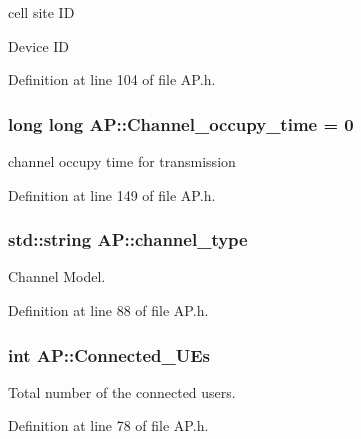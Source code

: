 cell site I\-D 

Device I\-D 

Definition at line 104 of file A\-P.\-h.

\hypertarget{classAP_a2c168786c0400fa590bed7fabbca741e}{
\subsubsection[{Channel\-\_\-occupy\-\_\-time}]{\setlength{\rightskip}{0pt plus 5cm}long long A\-P\-::\-Channel\-\_\-occupy\-\_\-time = 0}}\label{classAP_a2c168786c0400fa590bed7fabbca741e}


channel occupy time for transmission 



Definition at line 149 of file A\-P.\-h.

\hypertarget{classAP_a334f5b7be9725824797db57032de80e2}{
\subsubsection[{channel\-\_\-type}]{\setlength{\rightskip}{0pt plus 5cm}std\-::string A\-P\-::channel\-\_\-type\hspace{0.3cm}{\ttfamily [private]}}}\label{classAP_a334f5b7be9725824797db57032de80e2}


Channel Model. 



Definition at line 88 of file A\-P.\-h.

\hypertarget{classAP_af0d927a781e8776c18758508a6845c85}{
\subsubsection[{Connected\-\_\-\-U\-Es}]{\setlength{\rightskip}{0pt plus 5cm}int A\-P\-::\-Connected\-\_\-\-U\-Es\hspace{0.3cm}{\ttfamily [private]}}}\label{classAP_af0d927a781e8776c18758508a6845c85}


Total number of the connected users. 



Definition at line 78 of file A\-P.\-h.

